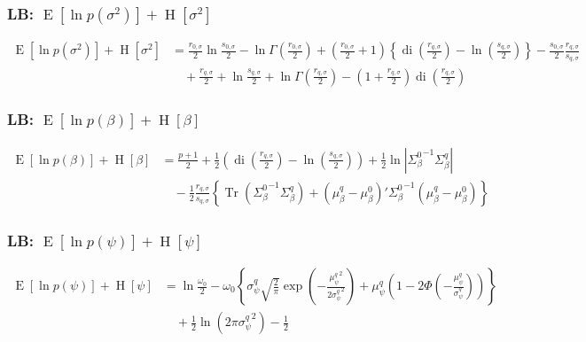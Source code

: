 \documentclass[11pt]{article}
\DeclareMathOperator{\Tr}{Tr}
\newcommand{\opn}{\operatorname}
\begin{document}
\subsubsection{LB: $\opn{E}\left[\ln p\left(\sigma^{2}\right)\right]+\opn{H}\left[\sigma^{2}\right]$}
\begin{align*}
  \opn{E}\left[\ln p\left(\sigma^{2}\right)\right]+\opn{H}\left[\sigma^{2}\right] &= \frac{r_{0,\sigma}}{2}\ln \frac{s_{0,\sigma}}{2} -\ln\Gamma\left(\frac{r_{0,\sigma}}{2}\right) +\left(\frac{r_{0,\sigma}}{2}+1\right)\left\{\opn{di}\left(\frac{r_{q,\sigma}}{2}\right)-\ln\left(\frac{s_{q,\sigma}}{2}\right) \right\} -\frac{s_{0,\sigma}}{2}\frac{r_{q,\sigma}}{s_{q,\sigma}}\\
  &\quad +\frac{r_{q,\sigma}}{2} +\ln\frac{s_{q,\sigma}}{2} +\ln\Gamma\left(\frac{r_{q,\sigma}}{2}\right) -\left(1+\frac{r_{q,\sigma}}{2}\right)\opn{di}\left(\frac{r_{q,\sigma}}{2}\right)
\end{align*}
\subsubsection{LB: $\opn{E}\left[\ln p\left(\beta\right)\right]+\opn{H}\left[\beta\right] $}
\begin{align*}
  \opn{E}\left[\ln p\left(\beta\right)\right]+\opn{H}\left[\beta\right] &= \frac{p+1}{2} +\frac{1}{2}\left(\opn{di}\left(\frac{r_{q,\sigma}}{2}\right)-\ln\left(\frac{s_{q,\sigma}}{2}\right)\right) +\frac{1}{2}\ln\left|{\Sigma_{\beta}^{0}}^{-1}\Sigma_{\beta}^{q}\right|\\
  &\quad -\frac{1}{2}\frac{r_{q,\sigma}}{s_{q,\sigma}}\left\{\Tr\left({\Sigma_{\beta}^{0}}^{-1}\Sigma_{\beta}^{q}\right)+\left(\mu_{\beta}^{q}-\mu_{\beta}^{0}\right)'{\Sigma_{\beta}^{0}}^{-1}\left(\mu_{\beta}^{q}-\mu_{\beta}^{0}\right) \right\}
\end{align*}
\subsubsection{LB: $\opn{E}\left[\ln p\left(\psi\right)\right] +\opn{H}\left[\psi\right]$}
\begin{align*}
  \opn{E}\left[\ln p\left(\psi\right)\right] +\opn{H}\left[\psi\right] &= \ln\frac{\omega_{0}}{2} -\omega_{0}\left\{\sigma_{\psi}^{q}\sqrt{\frac{2}{\pi}} \exp\left(-\frac{{\mu_{\psi}^{q}}^{2}}{2{\sigma_{\psi}^{q}}^{2}}\right) + \mu_{\psi}^{q}\left(1-2\Phi\left(-\frac{\mu_{\psi}^{q}}{\sigma_{\psi}^{q}}\right)\right) \right\}\\
  &\quad +\frac{1}{2}\ln\left(2\pi {\sigma_{\psi}^{q}}^{2}\right) -\frac{1}{2}
\end{align*}
\end{document}
